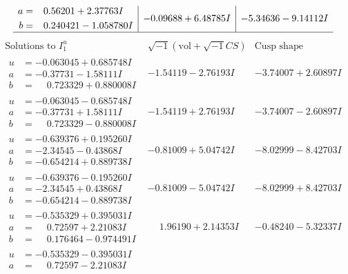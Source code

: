 \documentclass[1p]{elsarticle_modified}
\theoremstyle{definition}
\newcommand{\I}{\sqrt{-1}}
\begin{document}
$$\begin{array}{c|c|c}
\begin{aligned}
a &= \phantom{-}0.56201 + 2.37763 I \\
b &= \phantom{-}0.240421 - 1.058780 I\end{aligned}
 & -0.09688 + 6.48785 I & -5.34636 - 9.14112 I\\
 \hline 
 \end{array}$$\newpage$$\begin{array}{c|c|c}  
\text{Solutions to }I^u_{1}& \I (\text{vol} + \sqrt{-1}CS) & \text{Cusp shape}\\
 \hline 
\begin{aligned}
u &= -0.063045 + 0.685748 I \\
a &= -0.37731 - 1.58111 I \\
b &= \phantom{-}0.723329 + 0.880008 I\end{aligned}
 & -1.54119 - 2.76193 I & -3.74007 + 2.60897 I \\ \hline\begin{aligned}
u &= -0.063045 - 0.685748 I \\
a &= -0.37731 + 1.58111 I \\
b &= \phantom{-}0.723329 - 0.880008 I\end{aligned}
 & -1.54119 + 2.76193 I & -3.74007 - 2.60897 I \\ \hline\begin{aligned}
u &= -0.639376 + 0.195260 I \\
a &= -2.34545 - 0.43868 I \\
b &= -0.654214 + 0.889738 I\end{aligned}
 & -0.81009 + 5.04742 I & -8.02999 - 8.42703 I \\ \hline\begin{aligned}
u &= -0.639376 - 0.195260 I \\
a &= -2.34545 + 0.43868 I \\
b &= -0.654214 - 0.889738 I\end{aligned}
 & -0.81009 - 5.04742 I & -8.02999 + 8.42703 I \\ \hline\begin{aligned}
u &= -0.535329 + 0.395031 I \\
a &= \phantom{-}0.72597 + 2.21083 I \\
b &= \phantom{-}0.176464 - 0.974491 I\end{aligned}
 & \phantom{-}1.96190 + 2.14353 I & -0.48240 - 5.32337 I \\ \hline\begin{aligned}
u &= -0.535329 - 0.395031 I \\
a &= \phantom{-}0.72597 - 2.21083 I \\

\end{aligned}
\end{array}$$
\end{document}
